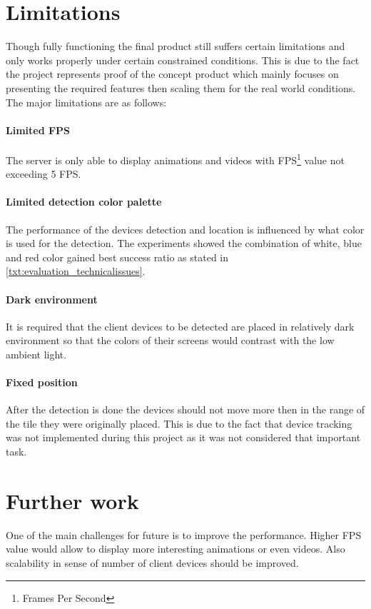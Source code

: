 \section{Limitations}
Though fully functioning the final product still suffers certain limitations and only works properly under certain constrained conditions. This is due to the fact the project represents proof of the concept product which mainly focuses on presenting the required features then scaling them for the real world conditions. The major limitations are as follows:

\paragraph{Limited FPS} The server is only able to display animations and videos with FPS\footnote{Frames Per Second} value not exceeding 5 FPS.

\paragraph{Limited detection color palette} The performance of the devices detection and location is influenced by what color is used for the detection. The experiments showed the combination of white, blue and red color gained best success ratio as stated in \ref{txt:evaluation_technicalissues}.

\paragraph{Dark environment} It is required that the client devices to be detected are placed in relatively dark environment so that the colors of their screens would contrast with the low ambient light.

\paragraph{Fixed position} After the detection is done the devices should not move more then in the range of the tile they were originally placed. This is due to the fact that device tracking was not implemented during this project as it was not considered that important task.

\section{Further work}
One of the main challenges for future is to improve the performance.
Higher FPS value would allow to display more interesting animations or even videos.
Also scalability in sense of number of client devices should be improved.

